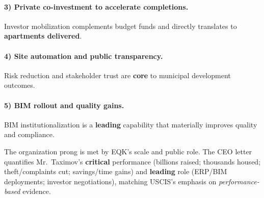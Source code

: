 \paragraph{3) Private co-investment to accelerate completions.}
Investor mobilization complements budget funds and directly translates to \textbf{apartments delivered}.

\paragraph{4) Site automation and public transparency.}
Risk reduction and stakeholder trust are \textbf{core} to municipal development outcomes.

\paragraph{5) BIM rollout and quality gains.}
BIM institutionalization is a \textbf{leading} capability that materially improves quality and compliance.

The organization prong is met by EQK’s scale and public role. The CEO letter quantifies Mr.\ Taximov’s \textbf{critical} performance (billions raised; thousands housed; theft/complaints cut; savings/time gains) and \textbf{leading} role (ERP/BIM deployments; investor negotiations), matching USCIS’s emphasis on \emph{performance-based} evidence.

